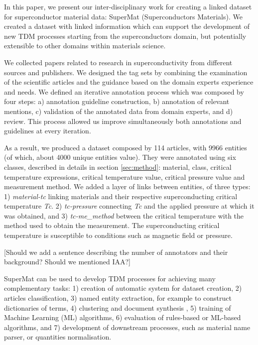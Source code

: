 \documentclass[a4paper,10pt]{article}
\begin{document}


In this paper, we present our inter-disciplinary work for creating a linked dataset for superconductor material data: SuperMat (Superconductors Materials). We created a dataset with linked information which can support the development of new TDM processes starting from the superconductors domain, but potentially extensible to other domains within materials science. 

We collected papers related to research in superconductivity from different sources and publishers.  
We designed the tag sets by combining the examination of the scientific articles and the guidance based on the domain experts experience and needs. 
We defined an iterative annotation process which was composed by four steps: a) annotation guideline construction, b) annotation of relevant mentions, c) validation of the annotated data from domain experts, and d) review. This process allowed us improve simultaneously  both annotations and guidelines at every iteration. 

As a result, we produced a dataset composed by 114 articles, with 9966 entities (of which, about 4000 unique entities value). They were annotated using six classes, described in details in section \ref{sec:method}: material, class, critical temperature expressions, critical temperature value, critical pressure value and measurement method.
We added a layer of links between entities, of three types: 1) \textit{material-tc} linking materials and their respective superconducting critical temperature \textit{Tc}. 
2) \textit{tc-pressure} connecting \textit{Tc} and the applied pressure at which it was obtained, and 3) \textit{tc-me\_method} between the critical temperature with the method used to obtain the measurement. 
The superconducting critical temperature is susceptible to conditions such as magnetic field or pressure. 

[Should we add a sentence describing the number of annotators and their background? Should we mentioned IAA?]

SuperMat can be used to develop TDM processes for achieving many complementary tasks: 
1) creation of automatic system for dataset creation, 
2) articles classification, 
3) named entity extraction, for example to construct dictionaries of terms, 
4) clustering and document synthesis ,
5) training of Machine Learning (ML) algorithms,
6) evaluation of rules-based or ML-based algorithms, and 
7) development of downstream processes, such as material name parser, or quantities normalisation.
\end{document}

